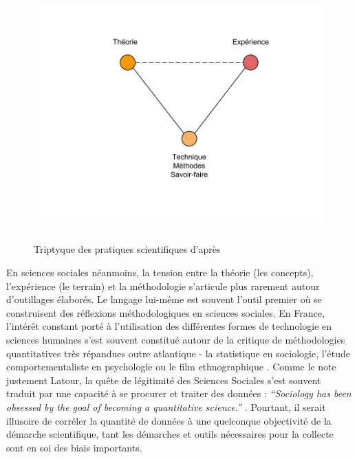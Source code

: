 \begin{figure}[htlp]
    \centering
    \includegraphics[width=5.0559in,height=3.7894in]{figures/chap3/chapitre3-img1.png}
    \caption[Triptyque des pratiques scientifiques]{Triptyque des pratiques scientifiques d'après \cite{Guichard2014}}
\end{figure}

En sciences sociales néanmoins, la tension entre la théorie (les concepts), l{\textquoteright}expérience (le terrain) et la méthodologie s{\textquoteright}articule plus rarement autour d{\textquoteright}outillages élaborés. Le langage lui-m\^eme est souvent l{\textquoteright}outil premier où se construisent des réflexions méthodologiques en sciences sociales. En France, l{\textquoteright}intér\^et constant porté à l{\textquoteright}utilisation des différentes formes de technologie en sciences humaines s{\textquoteright}est souvent constitué autour de la critique de méthodologies quantitatives très répandues outre atlantique - la statistique en sociologie, l{\textquoteright}étude comportementaliste en psychologie ou le film ethnographique \citep{Becker1996}. Comme le note justement Latour, la qu\^ete de légitimité des Sciences Sociales s{\textquoteright}est souvent traduit par une capacité à se procurer et traiter des données : \textit{{\textquotedblleft}Sociology has been obsessed by the goal of becoming a quantitative science.{\textquotedblright}} \citep{Latour2003}. Pourtant, il serait illusoire de corréler la quantité de données à une quelconque objectivité de la démarche scientifique, tant les démarches et outils nécessaires pour la collecte sont en soi des biais importants. 

